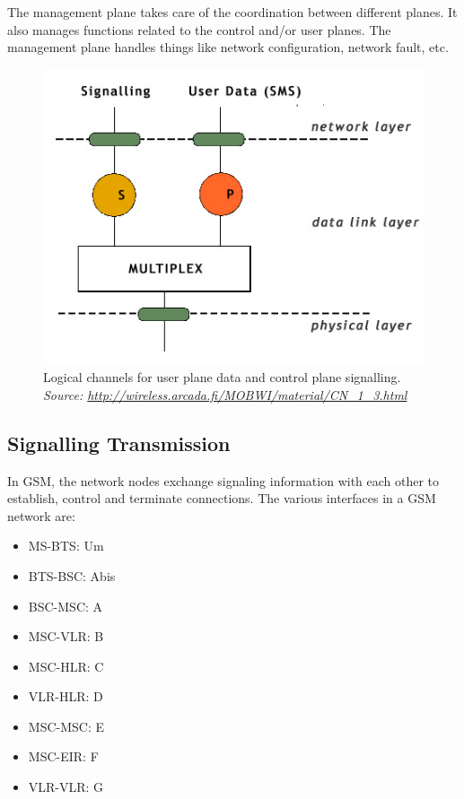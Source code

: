 The management plane takes care of the coordination between different planes.
It also manages functions related to the control and/or user planes.
The management plane handles things like network configuration, network fault, etc.

\begin{figure}
\centering
\includegraphics[scale=0.7]{logicalChannelsUserControl}
\caption[Logical channels for user plane data and control plane signalling]{Logical channels for user plane data and control plane signalling.
\emph{Source: \url{http://wireless.arcada.fi/MOBWI/material/CN\_1\_3.html}}}
\end{figure}

\subsection{Signalling Transmission}
In GSM, the network nodes exchange signaling information with each other to establish, control and terminate connections.
The various interfaces in a GSM network are:
\begin{itemize}
 \item MS-BTS: Um
 \item BTS-BSC: Abis
 \item BSC-MSC: A
 \item MSC-VLR: B
 \item MSC-HLR: C
 \item VLR-HLR: D
 \item MSC-MSC: E
 \item MSC-EIR: F
 \item VLR-VLR: G
\end{itemize}

